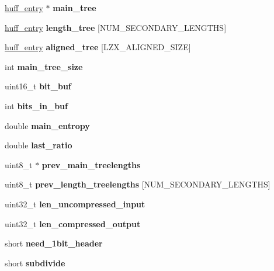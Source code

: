 \begin{DoxyCompactItemize}
\hyperlink{structhuff__entry}{huff\+\_\+entry} $\ast$ {\bfseries main\+\_\+tree}
\item 
\mbox{\label{structlzx__data_ad8425239e9b6359711506b4640233ec9}} 
\hyperlink{structhuff__entry}{huff\+\_\+entry} {\bfseries length\+\_\+tree} \mbox{[}N\+U\+M\+\_\+\+S\+E\+C\+O\+N\+D\+A\+R\+Y\+\_\+\+L\+E\+N\+G\+T\+HS\mbox{]}
\item 
\mbox{\label{structlzx__data_a7f9cf2b03e450813d1fab7e04876c8e0}} 
\hyperlink{structhuff__entry}{huff\+\_\+entry} {\bfseries aligned\+\_\+tree} \mbox{[}L\+Z\+X\+\_\+\+A\+L\+I\+G\+N\+E\+D\+\_\+\+S\+I\+ZE\mbox{]}
\item 
\mbox{\label{structlzx__data_a62f5416ea0f96149398773caea9e8036}} 
int {\bfseries main\+\_\+tree\+\_\+size}
\item 
\mbox{\label{structlzx__data_aa2fab886bd2f8677d6de21b1a5deccf2}} 
uint16\+\_\+t {\bfseries bit\+\_\+buf}
\item 
\mbox{\label{structlzx__data_a69d5147b05456f4610b70ff44fd008dd}} 
int {\bfseries bits\+\_\+in\+\_\+buf}
\item 
\mbox{\label{structlzx__data_ae3179c0ac7495e30b81a716526fd8950}} 
double {\bfseries main\+\_\+entropy}
\item 
\mbox{\label{structlzx__data_a5337ce9f7d78325f0036062daeb68f96}} 
double {\bfseries last\+\_\+ratio}
\item 
\mbox{\label{structlzx__data_a81302741dc35b0b29d9b65956e308c91}} 
uint8\+\_\+t $\ast$ {\bfseries prev\+\_\+main\+\_\+treelengths}
\item 
\mbox{\label{structlzx__data_aefad3261711110f31556fc0b8fbcae76}} 
uint8\+\_\+t {\bfseries prev\+\_\+length\+\_\+treelengths} \mbox{[}N\+U\+M\+\_\+\+S\+E\+C\+O\+N\+D\+A\+R\+Y\+\_\+\+L\+E\+N\+G\+T\+HS\mbox{]}
\item 
\mbox{\label{structlzx__data_a03f7cc9cc9b4c54864c0a67b12b69689}} 
uint32\+\_\+t {\bfseries len\+\_\+uncompressed\+\_\+input}
\item 
\mbox{\label{structlzx__data_acb6bb60bd52fa364cd566ca7d386ff3a}} 
uint32\+\_\+t {\bfseries len\+\_\+compressed\+\_\+output}
\item 
\mbox{\label{structlzx__data_a17335d851fe17a62efd762065be9aa3b}} 
short {\bfseries need\+\_\+1bit\+\_\+header}
\item 
\mbox{\label{structlzx__data_a4487d864140589821fda551d7d6f1fda}} 
short {\bfseries subdivide}
\end{DoxyCompactItemize}


